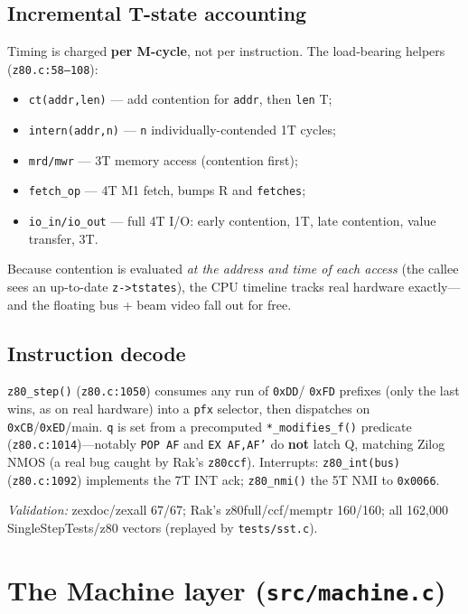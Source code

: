 \documentclass[11pt,a4paper]{article}
\begin{document}
\subsection{Incremental T-state accounting}
Timing is charged \textbf{per M-cycle}, not per instruction. The load-bearing
helpers (\texttt{z80.c:58--108}):
\begin{itemize}
\item \texttt{ct(addr,len)} --- add contention for \texttt{addr}, then \texttt{len} T;
\item \texttt{intern(addr,n)} --- \texttt{n} individually-contended 1T cycles;
\item \texttt{mrd/mwr} --- 3T memory access (contention first);
\item \texttt{fetch\_op} --- 4T M1 fetch, bumps R and \texttt{fetches};
\item \texttt{io\_in/io\_out} --- full 4T I/O: early contention, 1T, late
      contention, value transfer, 3T.
\end{itemize}
Because contention is evaluated \emph{at the address and time of each access}
(the callee sees an up-to-date \texttt{z->tstates}), the CPU timeline tracks
real hardware exactly---and the floating bus + beam video fall out for free.

\subsection{Instruction decode}
\texttt{z80\_step()} (\texttt{z80.c:1050}) consumes any run of \texttt{0xDD}/
\texttt{0xFD} prefixes (only the last wins, as on real hardware) into a
\texttt{pfx} selector, then dispatches on \texttt{0xCB}/\texttt{0xED}/main.
\texttt{q} is set from a precomputed \texttt{*\_modifies\_f()} predicate
(\texttt{z80.c:1014})---notably \texttt{POP AF} and \texttt{EX AF,AF'} do
\textbf{not} latch Q, matching Zilog NMOS (a real bug caught by Rak's
\texttt{z80ccf}). Interrupts: \texttt{z80\_int(bus)} (\texttt{z80.c:1092})
implements the 7T INT ack; \texttt{z80\_nmi()} the 5T NMI to \texttt{0x0066}.

\textit{Validation:} zexdoc/zexall 67/67; Rak's z80full/ccf/memptr 160/160; all
162{,}000 SingleStepTests/z80 vectors (replayed by \texttt{tests/sst.c}).

\section{The Machine layer (\texttt{src/machine.c})}
\end{document}

